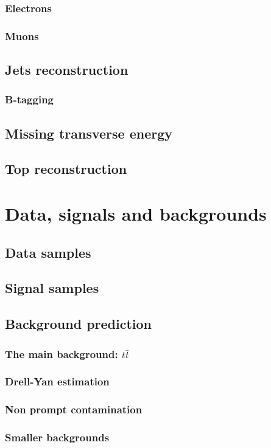 \documentclass[a4paper, 10pt, openright]{report}
\begin{document}
\subsection{Electrons}
\subsection{Muons}
\section{Jets reconstruction}
\subsection{B-tagging}
\section{Missing transverse energy}
\section{Top reconstruction}

\chapter{Data, signals and backgrounds} \label{chapter:Samples}
\section{Data samples}
\section{Signal samples}
\section{Background prediction}
\subsection{The main background: $t \bar t$}
\subsection{Drell-Yan estimation}
\subsection{Non prompt contamination}
\subsection{Smaller backgrounds}
\end{document}

